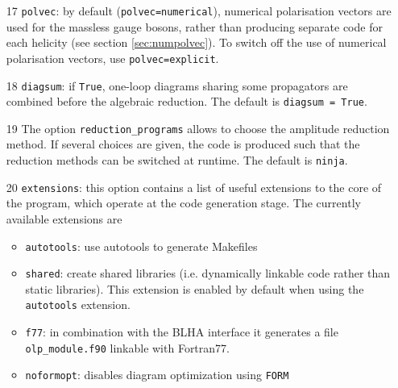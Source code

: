 \documentclass[11pt,a4paper]{refrep}
\newcommand{\qgraf}{{\tt QGraf}\xspace}
\newcommand{\form}{{\tt FORM}\xspace}
\begin{document}
\begin{enumerate}
 The value of the option \texttt{qgraf.verbatim} is
passed verbatim to the file \texttt{qgraf.dat}.
In our example we suppress the generation of diagrams containing Higgs and $Z$ bosons.
As these commands are passed verbatim to \qgraf, no mnemonic names
are allowed here, e.g. the Higgs particle has to be denoted by
`\lstinline[basicstyle=\ttfamily]{H}' and cannot be replaced by
`\lstinline[basicstyle=\ttfamily]{h}'.
For a complete list of available options, please consult the
\qgraf{} manual. For a complete list of particle names we refer to the 
documentation of the corresponding model file.
\\These options can be omitted.
\item[17] \texttt{polvec}: by default ({\tt polvec=numerical}), 
numerical polarisation vectors are used for the massless gauge bosons, 
rather than producing separate code for each helicity
(see section \ref{sec:numpolvec}). 
To switch off the use of numerical polarisation vectors, use {\tt polvec=explicit}.
\item[18] \texttt{diagsum}:  if {\tt True}, one-loop diagrams sharing some propagators
are combined before  the algebraic reduction.
The default is {\tt diagsum = True}. 
\item[19] The option \texttt{reduction\_programs} 
allows to choose the amplitude reduction method. If several choices are given, 
the code is produced such that the reduction methods can be switched at runtime.
The default is {\tt ninja}.
\item[20] {\tt extensions}: 
this option  contains a list of useful extensions
to the core of the program, which operate at the code generation stage. 
The currently available extensions are 
\begin{itemize}
\item {\tt autotools}:  use autotools to generate Makefiles            
\item {\tt shared}: create shared libraries (i.e. dynamically linkable code
rather than static libraries). This extension is 
enabled by default when using the {\tt autotools} extension.    
\item {\tt f77}: in combination with the BLHA interface it generates
                     a file {\tt olp\_module.f90} linkable with Fortran77.      
\item {\tt noformopt}:  disables diagram optimization using \form        

\end{itemize}
\end{enumerate}
\end{document}
